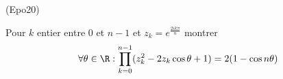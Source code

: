\begin{tiny}(Epo20)\end{tiny} Pour $k$ entier entre $0$ et $n-1$ et $z_k = e^{\frac{2ik\pi}{n}}$ montrer
\begin{displaymath}
 \forall\theta\in \R : \prod_{k=0}^{n-1}(z_k^2-2z_k\cos\theta +1)=2(1-\cos n\theta)
\end{displaymath}
